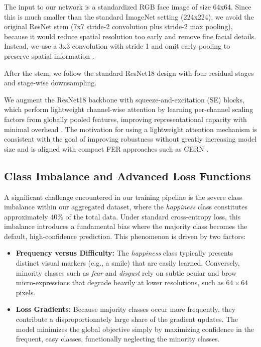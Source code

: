 The input to our network is a standardized RGB face image of size 64x64. Since this is much smaller than the standard ImageNet setting (224x224), we avoid the original ResNet stem (7x7 stride-2 convolution plus stride-2 max pooling), because it would reduce spatial resolution too early and remove fine facial details. Instead, we use a 3x3 convolution with stride 1 and omit early pooling to preserve spatial information \cite{cs231n2017}.

After the stem, we follow the standard ResNet18 design with four residual stages and stage-wise downsampling.

We augment the ResNet18 backbone with squeeze-and-excitation (SE) blocks, which perform lightweight channel-wise attention by learning per-channel scaling factors from globally pooled features, improving representational capacity with minimal overhead \cite{hu2018senet}. The motivation for using a lightweight attention mechanism is consistent with the goal of improving robustness without greatly increasing model size and is aligned with compact FER approaches such as CERN \cite{GERA20229}.
\subsection{Class Imbalance and Advanced Loss Functions}

A significant challenge encountered in our training pipeline is the severe class imbalance within our aggregated dataset, where the \textit{happiness} class constitutes approximately 40\% of the total data. Under standard cross-entropy loss, this imbalance introduces a fundamental bias where the majority class becomes the default, high-confidence prediction. This phenomenon is driven by two factors:
\begin{itemize}
    \item \textbf{Frequency versus Difficulty:} The \textit{happiness} class typically presents distinct visual markers (e.g., a smile) that are easily learned. Conversely, minority classes such as \textit{fear} and \textit{disgust} rely on subtle ocular and brow micro-expressions that degrade heavily at lower resolutions, such as $64 \times 64$ pixels.
    \item \textbf{Loss Gradients:} Because majority classes occur more frequently, they contribute a disproportionately large share of the gradient updates. The model minimizes the global objective simply by maximizing confidence in the frequent, easy classes, functionally neglecting the minority classes.
\end{itemize}

